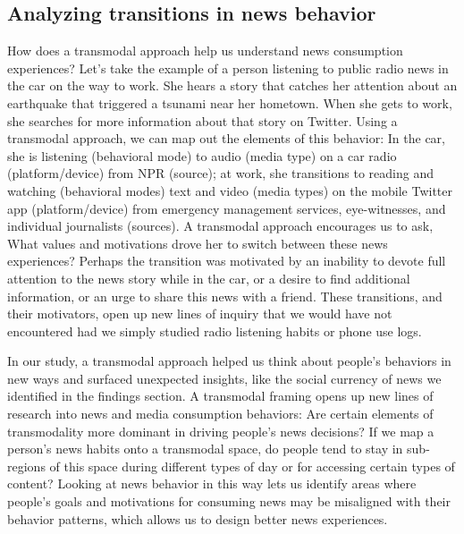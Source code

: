 \documentclass[sigchi]{acmart}
\begin{document}
\subsection{Analyzing transitions in news behavior}
How does a transmodal approach help us understand news consumption experiences? Let's take the example of a person listening to public radio news in the car on the way to work. She hears a story that catches her attention about an earthquake that triggered a tsunami near her hometown. When she gets to work, she searches for more information about that story on Twitter. Using a transmodal approach, we can map out the elements of this behavior: In the car, she is listening (behavioral mode) to audio (media type) on a car radio (platform/device) from NPR (source); at work, she transitions to reading and watching (behavioral modes) text and video (media types) on the mobile Twitter app (platform/device) from emergency management services, eye-witnesses, and individual journalists (sources). A transmodal approach encourages us to ask, What values and motivations drove her to switch between these news experiences? Perhaps the transition was motivated by an inability to devote full attention to the news story while in the car, or a desire to find additional information, or an urge to share this news with a friend. These transitions, and their motivators, open up new lines of inquiry that we would have not encountered had we simply studied radio listening habits or phone use logs. 

In our study, a transmodal approach helped us think about people's behaviors in new ways and surfaced unexpected insights, like the social currency of news we identified in the findings section. A transmodal framing opens up new lines of research into news and media consumption behaviors: Are certain elements of transmodality more dominant in driving people's news decisions? If we map a person's news habits onto a transmodal space, do people tend to stay in sub-regions of this space during different types of day or for accessing certain types of content? Looking at news behavior in this way lets us identify areas where people's goals and motivations for consuming news may be misaligned with their behavior patterns, which allows us to design better news experiences.
\end{document}
